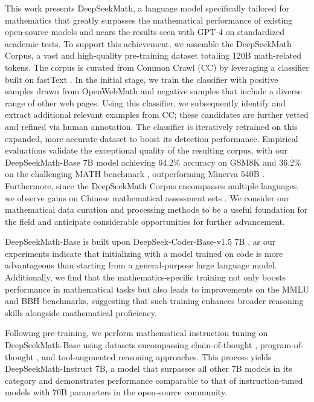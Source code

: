 This work presents DeepSeekMath, a language model specifically tailored for mathematics that greatly surpasses the mathematical performance of existing open-source models and nears the results seen with GPT-4 on standardized academic tests. To support this achievement, we assemble the DeepSeekMath Corpus, a vast and high-quality pre-training dataset totaling 120B math-related tokens. The corpus is curated from Common Crawl (CC) by leveraging a classifier built on fastText \citep{joulin2016fasttext}. In the initial stage, we train the classifier with positive samples drawn from OpenWebMath \citep{openwebmath} and negative samples that include a diverse range of other web pages. Using this classifier, we subsequently identify and extract additional relevant examples from CC; these candidates are further vetted and refined via human annotation. The classifier is iteratively retrained on this expanded, more accurate dataset to boost its detection performance. Empirical evaluations validate the exceptional quality of the resulting corpus, with our DeepSeekMath-Base 7B model achieving 64.2\% accuracy on GSM8K \citep{gsm8k} and 36.2\% on the challenging MATH benchmark \citep{MATH}, outperforming Minerva 540B \citep{minerva}. Furthermore, since the DeepSeekMath Corpus encompasses multiple languages, we observe gains on Chinese mathematical assessment sets \citep{wei2023cmath,agieval}. We consider our mathematical data curation and processing methods to be a useful foundation for the field and anticipate considerable opportunities for further advancement.

DeepSeekMath-Base is built upon DeepSeek-Coder-Base-v1.5 7B \citep{deepseek-coder}, as our experiments indicate that initializing with a model trained on code is more advantageous than starting from a general-purpose large language model. Additionally, we find that the mathematics-specific training not only boosts performance in mathematical tasks but also leads to improvements on the MMLU \citep{mmlu} and BBH \citep{bbh} benchmarks, suggesting that such training enhances broader reasoning skills alongside mathematical proficiency.

Following pre-training, we perform mathematical instruction tuning on DeepSeekMath-Base using datasets encompassing chain-of-thought \citep{cot}, program-of-thought \citep{pot,pal}, and tool-augmented reasoning \citep{tora} approaches. This process yields DeepSeekMath-Instruct 7B, a model that surpasses all other 7B models in its category and demonstrates performance comparable to that of instruction-tuned models with 70B parameters in the open-source community.

